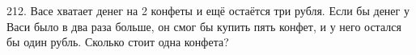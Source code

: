 212. Васе хватает денег на 2 конфеты и ещё остаётся три рубля. Если бы денег у Васи было в два раза больше, он смог бы купить пять конфет, и у него остался бы один рубль. Сколько стоит одна конфета?\\
